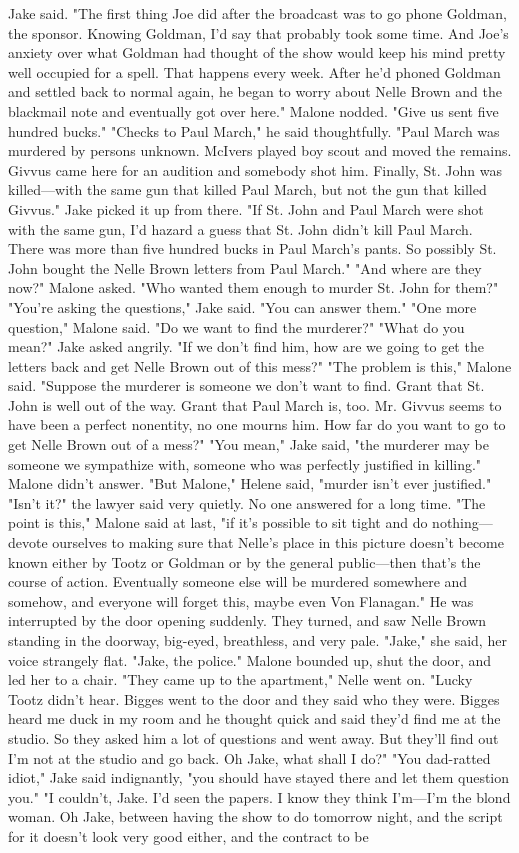 \documentclass{novel}
\begin{document}
Jake said. "The first thing Joe did after the broadcast was to go phone Goldman, the sponsor. Knowing Goldman, I'd say that probably took some time. And Joe's anxiety over what Goldman had thought of the show would keep his mind pretty well occupied for a spell. That happens every week. After he'd phoned Goldman and settled back to normal again, he began to worry about Nelle Brown and the blackmail note and eventually got over here." Malone nodded. "Give us sent five hundred bucks." "Checks to Paul March," he said thoughtfully. "Paul March was murdered by persons unknown. McIvers played boy scout and moved the remains. Givvus came here for an audition and somebody shot him. Finally, St. John was killed—with the same gun that killed Paul March, but not the gun that killed Givvus." Jake picked it up from there. "If St. John and Paul March were shot with the same gun, I’d hazard a guess that St. John didn’t kill Paul March. There was more than five hundred bucks in Paul March’s pants. So possibly St. John bought the Nelle Brown letters from Paul March." "And where are they now?" Malone asked. "Who wanted them enough to murder St. John for them?" "You’re asking the questions," Jake said. "You can answer them." "One more question," Malone said. "Do we want to find the murderer?" "What do you mean?" Jake asked angrily. "If we don’t find him, how are we going to get the letters back and get Nelle Brown out of this mess?" "The problem is this," Malone said. "Suppose the murderer is someone we don’t want to find. Grant that St. John is well out of the way. Grant that Paul March is, too. Mr. Givvus seems to have been a perfect nonentity, no one mourns him. How far do you want to go to get Nelle Brown out of a mess?" "You mean," Jake said, "the murderer may be someone we sympathize with, someone who was perfectly justified in killing." Malone didn’t answer. "But Malone," Helene said, "murder isn’t ever justified." "Isn’t it?" the lawyer said very quietly. No one answered for a long time. "The point is this," Malone said at last, "if it’s possible to sit tight and do nothing—devote ourselves to making sure that Nelle’s place in this picture doesn’t become known either by Tootz or Goldman or by the general public—then that’s the course of action. Eventually someone else will be murdered somewhere and somehow, and everyone will forget this, maybe even Von Flanagan." He was interrupted by the door opening suddenly. They turned, and saw Nelle Brown standing in the doorway, big-eyed, breathless, and very pale. "Jake," she said, her voice strangely flat. "Jake, the police." Malone bounded up, shut the door, and led her to a chair. "They came up to the apartment," Nelle went on. "Lucky Tootz didn’t hear. Bigges went to the door and they said who they were. Bigges heard me duck in my room and he thought quick and said they’d find me at the studio. So they asked him a lot of questions and went away. But they’ll find out I’m not at the studio and go back. Oh Jake, what shall I do?" "You dad-ratted idiot," Jake said indignantly, "you should have stayed there and let them question you." "I couldn’t, Jake. I’d seen the papers. I know they think I’m—I’m the blond woman. Oh Jake, between having the show to do tomorrow night, and the script for it doesn’t look very good either, and the contract to be 
\end{document}
